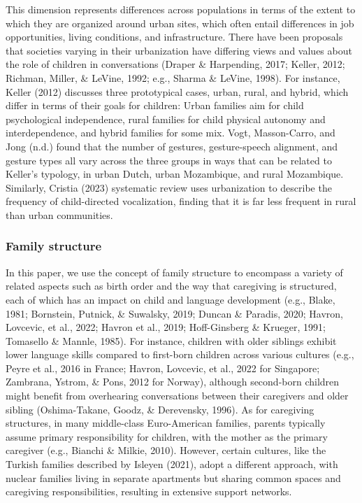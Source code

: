 \documentclass[
  man,floatsintext]{apa6}
\begin{document}
This dimension represents differences across populations in terms of the extent to which they are organized around urban sites, which often entail differences in job opportunities, living conditions, and infrastructure. There have been proposals that societies varying in their urbanization have differing views and values about the role of children in conversations (Draper \& Harpending, 2017; Keller, 2012; Richman, Miller, \& LeVine, 1992; e.g., Sharma \& LeVine, 1998). For instance, Keller (2012) discusses three prototypical cases, urban, rural, and hybrid, which differ in terms of their goals for children: Urban families aim for child psychological independence, rural families for child physical autonomy and interdependence, and hybrid families for some mix. Vogt, Masson-Carro, and Jong (n.d.) found that the number of gestures, gesture-speech alignment, and gesture types all vary across the three groups in ways that can be related to Keller's typology, in urban Dutch, urban Mozambique, and rural Mozambique. Similarly, Cristia (2023) systematic review uses urbanization to describe the frequency of child-directed vocalization, finding that it is far less frequent in rural than urban communities.

\subsubsection{Family structure}\label{family-structure}

In this paper, we use the concept of family structure to encompass a variety of related aspects such as birth order and the way that caregiving is structured, each of which has an impact on child and language development (e.g., Blake, 1981; Bornstein, Putnick, \& Suwalsky, 2019; Duncan \& Paradis, 2020; Havron, Lovcevic, et al., 2022; Havron et al., 2019; Hoff-Ginsberg \& Krueger, 1991; Tomasello \& Mannle, 1985). For instance, children with older siblings exhibit lower language skills compared to first-born children across various cultures (e.g., Peyre et al., 2016 in France; Havron, Lovcevic, et al., 2022 for Singapore; Zambrana, Ystrom, \& Pons, 2012 for Norway), although second-born children might benefit from overhearing conversations between their caregivers and older sibling (Oshima-Takane, Goodz, \& Derevensky, 1996).
As for caregiving structures, in many middle-class Euro-American families, parents typically assume primary responsibility for children, with the mother as the primary caregiver (e.g., Bianchi \& Milkie, 2010). However, certain cultures, like the Turkish families described by Isleyen (2021), adopt a different approach, with nuclear families living in separate apartments but sharing common spaces and caregiving responsibilities, resulting in extensive support networks.
\end{document}
